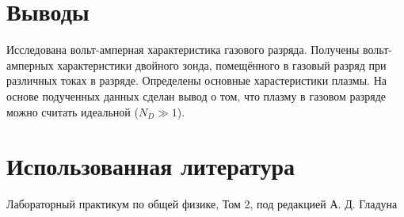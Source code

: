 \documentclass[12pt]{article}
\begin{document}
\section*{Выводы}
Исследована вольт-амперная характеристика газового разряда. Получены вольт-амперных характеристики 
двойного зонда, помещённого в газовый разряд при различных токах в разряде. Определены основные харастеристики плазмы. 
На основе подученных данных сделан вывод о том, что плазму в газовом разряде можно считать идеальной ($N_D \gg 1$).


\section*{Использованная литература}
\begin{thebibliography}{9}
	Лабораторный практикум по общей физике, Том 2, под редакцией А. Д. Гладуна
\end{thebibliography}
\end{document}
